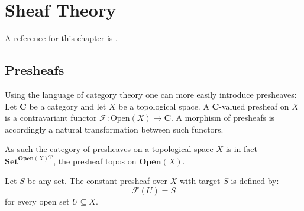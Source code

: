 \chapter{Sheaf Theory}\label{chapter:sheaf}

A reference for this chapter is \cite{brylinski}.

\section{Presheafs}

	
	
	\begin{adefinition}
		Using the language of category theory one can more easily introduce presheaves: Let $\mathbf{C}$ be a category and let $X$ be a topological space. A $\mathbf{C}$-valued presheaf on $X$ is a contravariant functor $\mathcal{F}:\text{Open}(X)\rightarrow\mathbf{C}$. A morphism of presheafs is accordingly a natural transformation between such functors.
		
		As such the category of presheaves on a topological space $X$ is in fact $\textbf{Set}^{\textbf{Open}(X)^{op}}$, the presheaf topos on $\textbf{Open}(X)$.
	\end{adefinition}
	
	\begin{example}\label{sheaf:constant_presheaf}
		Let $S$ be any set. The constant presheaf over $X$ with target $S$ is defined by:\[\mathcal{F}(U) = S\] for every open set $U\subseteq X$.
	\end{example}

